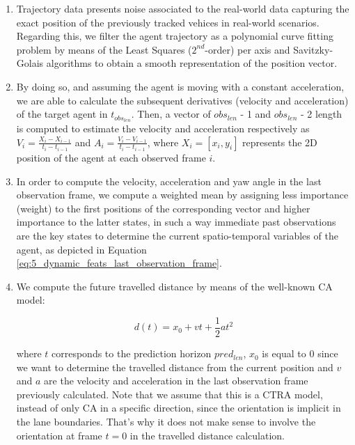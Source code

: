 \begin{enumerate}
	
	\item Trajectory data presents noise associated to the real-world data capturing the exact position of the previously tracked vehices in real-world scenarios. Regarding this, we filter the agent trajectory as a polynomial curve fitting problem by means of the Least Squares ($2^{nd}$-order) per axis and Savitzky-Golais \cite{savitzky1964smoothing} algorithms to obtain a smooth representation of the position vector.
	
	\item By doing so, and assuming the agent is moving with a constant acceleration, we are able to calculate the subsequent derivatives (velocity and acceleration) of the target agent in $t_{obs_{len}}$. Then, a vector of $obs_{len}$ - 1 and $obs_{len}$ - 2 length is computed to estimate the velocity and acceleration respectively as $V_{i}=\frac{X_{i}-X_{i-1}}{t_{i}-t_{i-1}}$ and $A_{i}=\frac{V_{i}-V_{i-1}}{t_{i}-t_{i-1}}$, where $X_{i}={[x_{i},y_{i}]}$ represents the 2D position of the agent at each observed frame $i$.
	
	\item In order to compute the velocity, acceleration and yaw angle in the last observation frame, we compute a weighted mean by assigning less importance (weight) to the first positions of the corresponding vector and higher importance to the latter states, in such a way immediate past observations are the key states to determine the current spatio-temporal variables of the agent, as depicted in Equation \ref{eq:5_dynamic_feats_last_observation_frame}.
	
	\item We compute the future travelled distance by means of the well-known \ac{CA} model:
	
	\begin{equation}
		d(t) = x_0 + vt + \frac{1}{2}at^2
	\end{equation}
	
	where $t$ corresponds to the prediction horizon $pred_{len}$, $x_0$ is equal to $0$ since we want to determine the travelled distance from the current position and $v$ and $a$ are the velocity and acceleration in the last observation frame previously calculated. Note that we assume that this is a \ac{CTRA} model, instead of only \ac{CA} in a specific direction, since the orientation is implicit in the lane boundaries. That's why it does not make sense to involve the orientation at frame $t=0$ in the travelled distance calculation.
	

\end{enumerate}
